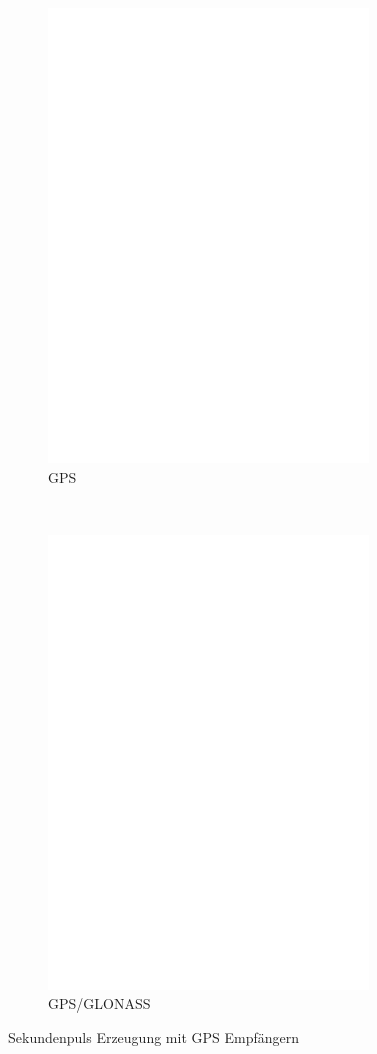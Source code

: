 \begin{figure}[H]
  \begin{subfigure}[b]{9cm}
    \centering
    \includegraphics[width=8.5cm]{../FIG/GPS_UP501.eps}
    \caption{GPS}
  \end{subfigure}
  ~
  \begin{subfigure}[b]{9cm}
    \centering
    \includegraphics[width=8.5cm]{../FIG/GPS_GNS701.eps}
    \caption{GPS/GLONASS}
  \end{subfigure}
  \caption{Sekundenpuls Erzeugung mit GPS Empfängern }
  \label{fig:GPS-1PPS}
\end{figure}

